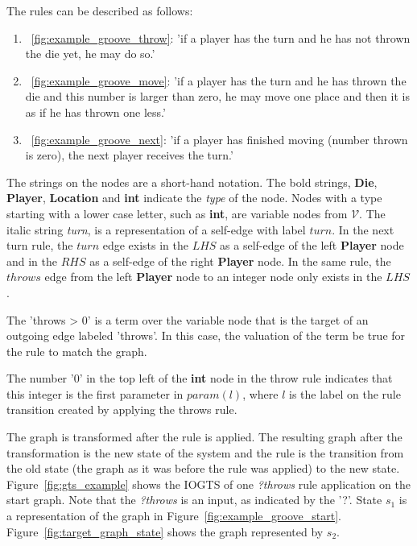 The rules can be described as follows:
\begin{enumerate}
  \item~\ref{fig:example_groove_throw}: 'if a player has the turn and he has not thrown the die yet, he may do so.'
  \item~\ref{fig:example_groove_move}: 'if a player has the turn and he has thrown the die and this number is larger than zero, he may move one place and then it is as if he has thrown one less.'
  \item~\ref{fig:example_groove_next}: 'if a player has finished moving (number thrown is zero), the next player receives the turn.'
\end{enumerate}

The strings on the nodes are a short-hand notation. The bold strings, \textbf{Die}, \textbf{Player}, \textbf{Location} and \textbf{int} indicate the \textit{type} of the node. Nodes with a type starting with a lower case letter, such as \textbf{int}, are variable nodes from $\mathcal{V}$. The italic string \textit{turn}, is a representation of a self-edge with label $turn$. In the next turn rule, the $turn$ edge exists in the $\mathit{LHS}$ as a self-edge of the left \textbf{Player} node and in the $\mathit{RHS}$ as a self-edge of the right \textbf{Player} node. In the same rule, the $throws$ edge from the left \textbf{Player} node to an integer node only exists in the $\mathit{LHS}$.

The 'throws > 0' is a term over the variable node that is the target of an outgoing edge labeled 'throws'. In this case, the valuation of the term be true for the rule to match the graph.

The number '0' in the top left of the \textbf{int} node in the throw rule indicates that this integer is the first parameter in $param(l)$, where $l$ is the label on the rule transition created by applying the throws rule.

The graph is transformed after the rule is applied. The resulting graph after the transformation is the new state of the system and the rule is the transition from the old state (the graph as it was before the rule was applied) to the new state. Figure~\ref{fig:gts_example} shows the IOGTS of one \textit{?throws} rule application on the start graph. Note that the \textit{?throws} is an input, as indicated by the '?'. State $s_1$ is a representation of the graph in Figure~\ref{fig:example_groove_start}. Figure~\ref{fig:target_graph_state} shows the graph represented by $s_2$.

